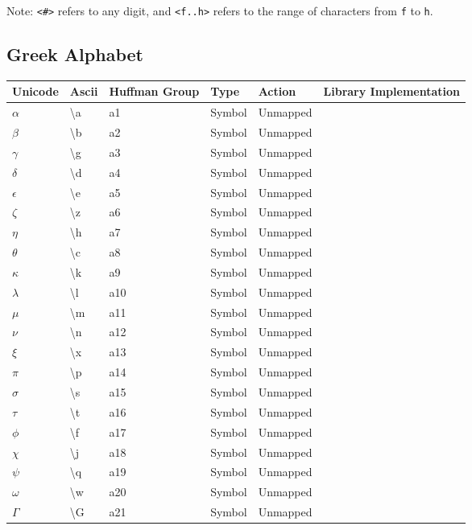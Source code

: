 \documentclass{article}
\newcommand\escape\textbackslash
\begin{document}
Note: \texttt{<\#>} refers to any digit, and \texttt{<f..h>} refers to the range of characters from
    \texttt f to \texttt h.

\subsection{Greek Alphabet}

\begin{tabular}{| >{\ttfamily}l| >{\ttfamily}l| >{\ttfamily}l|l|l| >{\ttfamily}l|}
    \hline
    \textbf{Unicode} & \textbf{Ascii} & \textbf{Huffman Group} & \textbf{Type} & \textbf{Action} & \textbf{Library Implementation}\\
    \hline
    $\alpha$ & \escape a & a1 & Symbol & Unmapped&\\
    $\beta$ & \escape b & a2 & Symbol & Unmapped&\\
    $\gamma$ & \escape g & a3 & Symbol & Unmapped&\\
    $\delta$ & \escape d & a4 & Symbol & Unmapped&\\
    $\epsilon$ & \escape e & a5 & Symbol & Unmapped&\\
    $\zeta$ & \escape z & a6 & Symbol & Unmapped&\\
    $\eta$ & \escape h & a7 & Symbol & Unmapped&\\
    $\theta$ & \escape c & a8 & Symbol & Unmapped&\\
    $\kappa$ & \escape k & a9 & Symbol & Unmapped&\\
    $\lambda$ & \escape l & a10 & Symbol & Unmapped&\\
    $\mu$ & \escape m & a11 & Symbol & Unmapped&\\
    $\nu$ & \escape n & a12 & Symbol & Unmapped&\\
    $\xi$ & \escape x & a13 & Symbol & Unmapped&\\
    $\pi$ & \escape p & a14 & Symbol & Unmapped&\\
    $\sigma$ & \escape s & a15 & Symbol & Unmapped&\\
    $\tau$ & \escape t & a16 & Symbol & Unmapped&\\
    $\phi$ & \escape f & a17 & Symbol & Unmapped&\\
    $\chi$ & \escape j & a18 & Symbol & Unmapped&\\
    $\psi$ & \escape q & a19 & Symbol & Unmapped&\\
    $\omega$ & \escape w & a20 & Symbol & Unmapped&\\
    $\Gamma$ & \escape G & a21 & Symbol & Unmapped&\\

\end{tabular}
\end{document}
